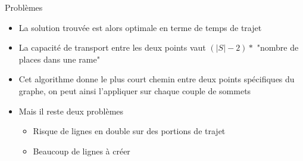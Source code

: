 \documentclass[aspectratio=43,11pt]{beamer}
\begin{document}
\begin{frame}{Problèmes}
    \begin{itemize}
        \item La solution trouvée est alors optimale en terme de temps de trajet
        \item La capacité de transport entre les deux points vaut $(|S| - 2) *$ "nombre de places dans une rame"
        \item Cet algorithme donne le plus court chemin entre deux points spécifiques du graphe, on peut ainsi l'appliquer sur chaque couple de sommets
        \item Mais il reste deux problèmes
        \begin{itemize}
            \item Risque de lignes en double sur des portions de trajet
            \item Beaucoup de lignes à créer
        \end{itemize}
    \end{itemize}
\end{frame}
\end{document}

